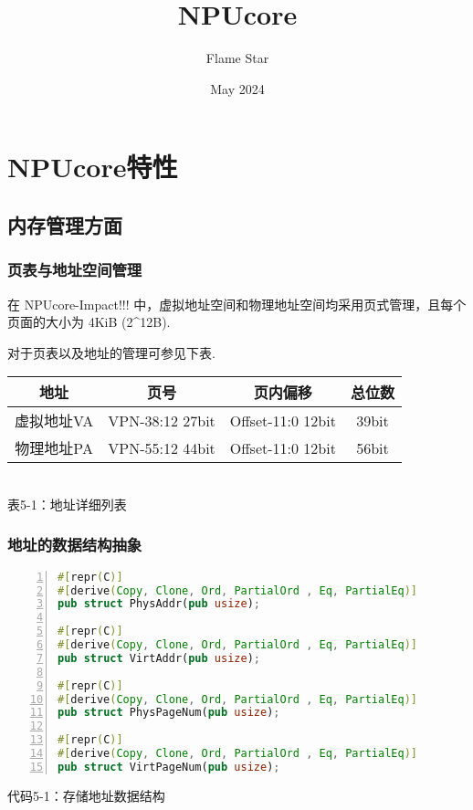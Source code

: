 \documentclass{article}
\title{NPUcore}
\author{Flame Star}
\date{May 2024}
\begin{document}
\maketitle

\section{NPUcore特性}
\subsection{内存管理方面}
\subsubsection{页表与地址空间管理}
在 NPUcore-Impact!!! 中，虚拟地址空间和物理地址空间均采用页式管理，且每个页面的大小为 4KiB (2^{12}B).

对于页表以及地址的管理可参见下表.\\

\begin{center}
\begin{tabular}{|c|c|c|c|}
\hline
地址 & 页号 & 页内偏移 & 总位数 \\
\hline
虚拟地址VA & VPN-38:12 27bit & Offset-11:0 12bit & 39bit \\
物理地址PA & VPN-55:12 44bit & Offset-11:0 12bit & 56bit \\
\hline
\end{tabular}
\\

表5-1：地址详细列表

\end{center}
\subsubsection{地址的数据结构抽象}
\begin{center}
\begin{lstlisting}[language=RUST,numbers=left]
#[repr(C)]
#[derive(Copy, Clone, Ord, PartialOrd , Eq, PartialEq)]
pub struct PhysAddr(pub usize);

#[repr(C)]
#[derive(Copy, Clone, Ord, PartialOrd , Eq, PartialEq)]
pub struct VirtAddr(pub usize);

#[repr(C)]
#[derive(Copy, Clone, Ord, PartialOrd , Eq, PartialEq)]
pub struct PhysPageNum(pub usize);

#[repr(C)]
#[derive(Copy, Clone, Ord, PartialOrd , Eq, PartialEq)]
pub struct VirtPageNum(pub usize);
\end{lstlisting}

代码5-1：存储地址数据结构
\end{center}
\end{document}
